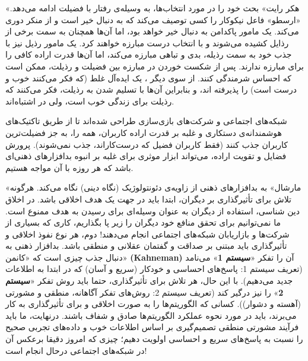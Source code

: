 «هکر رایت» بحث خود را در مورد انتخاب‌ها، به وسیله‌ی رفتار با فضیلت ادامه می‌دهد.
«ارسطو» فاعل نیکوکار را کسی توصیف می‌کند که به دنبال خیر است و از منکر دوری می‌کند.
یک مامور پاکدامن به دنبال خیر خواهد بود، اما آن‌ها همچنان به سمت برخی از رذایل کشیده می‌شوند و با انتخاب درست مبارزه خواهند کرد.
یک مامور رذیل نیز با جذب خود به سمت رذیله، بدی و تباهی مبارزه می‌کند، اما آن‌ها قدرت اراده کافی را برای مبارزه ندارند.
پس از شکست خوردن در مبارزه بین فضیلت و رذیلت، ممکن است که احساس شرمندگی کنند.
از سوی دیگر ، یک ایده‌آل غلط (که فکر می‌کنند خوب و درست است) را پذیرفته اند، و بنابراین آن‌ها با تسلیم شدن به رذیلت، فکر می‌کنند که رذیلت برای زندگی خوب است، ولی در اشتباه‌اند.

شبکه‌های اجتماعی و شرکت‌های بازی‌سازی طراحی شده‌اند تا از طریق تاکتیک‌های هوشمندانه‌ی دستکاری و غلبه بر قدرت اراده کاربران، همه را، به جز فضیلت‌ترین کاربران جذب کنند (فقط کاربران فضیل که درست‌کاراند، جذب نمی‌شوند).
پرورش فضایل و تقویت اراده، می‌تواند ابزار موثری برای غلبه بر انبوه بدافزارهای ذهنی‌ای باشد که هر روزه با آن مواجه هستیم.

«مارشال» به بدافزارهای ذهنی از زاویه‌ی دئونتولوژیک (نگاه دینی) نگاه می‌کند.
هرگونه تلاش برای تأثیرگذاری بر دیگران، ابتدا باید در جهت یک هدف اخلاقی باشد.
در اخلاق دین شناسی، استفاده از دیگران به عنوان وسیله‌ای برای رسیدن به هدف ممنوع است.
ما نمی‌توانیم برای تحقق منافع خود دیگران را زیر پا بگذاریم، کاری که بسیاری از شرکت‌ها و بازاریابان شبکه‌های اجتماعی انجام می‌دهند!
دوم، هر نوع نفوذ اخلاقی و تأثیرگذاری باید مبتنی بر صداقت و گفتمان عقلانی و منطقی باشد.
بدافزار ذهنی به دنبال جذب چیزی است که «کانمن» \textenglish{\textbf{(Kahneman)}} آن را تفکر «\textbf{سیستم 1}» می‌نامد (تعریف سیستم 1: پاسخ‌های احساسی و خودکار (سریع و آسان) که در ابتدا به اطلاعات جدید می‌دهیم).
با این حال، هر تلاش برای تأثیرگذاری، حتما باید روش تفکر «\textbf{سیستم 2}» را نیز درگیر کند (تعریف سیستم 2: روش‌های تفکر آگاهانه، منطقی و مشورتی (آهسته و دشوار)).
کسانی که الگوریتم‌ها را به صورت اخلاقی و برای تأثیرگذاری به کار می‌برند، باید در مورد نحوه عملکرد الگوریتم‌ها صادق و شفاف باشند.
درنهایت، ما باید فرآیند مشورتی منطقی تصمیم‌گیری بر اساس اطلاعات خوب و داده‌های تجربی صحیح را نسبت به پاسخ‌های سریع و احساسی اولویت دهیم؛ چیزی که امروز دقیقا برعکس آن در شبکه‌های اجتماعی درحال انجام است!

